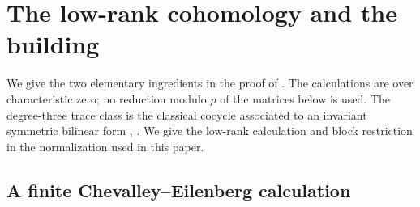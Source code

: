 \appendix
\section{The low-rank cohomology and the building}
\label{app:background}

We give the two elementary ingredients in the proof of
.  The calculations are over characteristic
zero; no reduction modulo $p$ of the matrices below is used.
The degree-three trace class is the classical cocycle associated to an
invariant symmetric bilinear form
\cite[\S21]{ChevalleyEilenberg1948}, \cite[\S11]{Koszul1950}.
We give the low-rank calculation and block restriction in the
normalization used in this paper.

\subsection{A finite Chevalley--Eilenberg calculation}
\label{app:ce}

